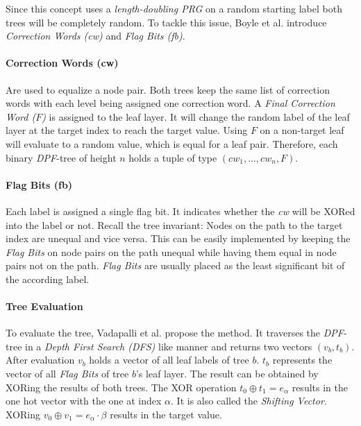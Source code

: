 Since this concept uses a \textit{length-doubling PRG} on a random starting label both trees will be completely random.
To tackle this issue, Boyle et al. \cite{boyle2016function} introduce \textit{Correction Words (cw)} and \textit{Flag Bits (fb)}.

\paragraph{Correction Words (cw)}
Are used to equalize a node pair. 
Both trees keep the same list of correction words with each level being assigned one correction word.
A \textit{Final Correction Word ($F$)} is assigned to the leaf layer.
It will change the random label of the leaf layer at the target index to reach the target value.
Using $F$ on a non-target leaf will evaluate to a random value, which is equal for a leaf pair.
Therefore, each binary \textit{DPF}-tree of height $n$ holds a tuple of type $(cw_1, ..., cw_n, F)$.

\paragraph{Flag Bits (fb)}
Each label is assigned a single flag bit.
It indicates whether the \textit{cw} will be XORed into the label or not.
Recall the tree invariant: Nodes on the path to the target index are unequal and vice versa.
This can be easily implemented by keeping the \textit{Flag Bits} on node pairs on the path unequal while having them equal in node pairs not on the path.
\textit{Flag Bits} are usually placed as the least significant bit of the according label.

\paragraph{Tree Evaluation}
To evaluate the tree, Vadapalli et al. \cite{vadapalli2023duoram} propose the  method.
It traverses the \textit{DPF}-tree in a \textit{Depth First Search (DFS)} like manner and returns two vectors $(v_b,t_b)$.
After evaluation $v_b$ holds a vector of all leaf labels of tree $b$.
$t_b$ represents the vector of all \textit{Flag Bits} of tree $b$'s leaf layer.
The result can be obtained by XORing the results of both trees.
The XOR operation $t_0\oplus t_1 = e_\alpha$ results in the one hot vector with the one at index $\alpha$.
It is also called the \textit{Shifting Vector}.
XORing $v_0\oplus v_1 = e_\alpha\cdot\beta$ results in the target value. 

